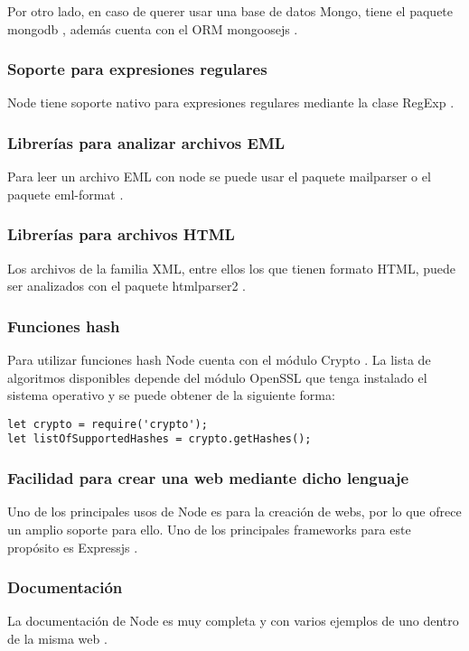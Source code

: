 Por otro lado, en caso de querer usar una base de datos Mongo, tiene el paquete mongodb \cite{node_mongo_driver}, además cuenta con el ORM mongoosejs \cite{node_Mongoosejs}.

\subsubsection{Soporte para expresiones regulares}
Node tiene soporte nativo para expresiones regulares mediante la clase RegExp \cite{node_regex}.

\subsubsection{Librerías para analizar archivos EML}
Para leer un archivo EML con node se puede usar el paquete mailparser \cite{node_mailparser} o el paquete eml-format \cite{node_eml_format}.

\subsubsection{Librerías para archivos HTML}
Los archivos de la familia XML, entre ellos los  que tienen formato HTML, puede ser analizados con el paquete htmlparser2 \cite{node_htmlparser2}.

\subsubsection{Funciones hash}
Para utilizar funciones hash Node cuenta con el módulo Crypto \cite{node_Crypto}. La lista de algoritmos disponibles depende del módulo OpenSSL que tenga instalado el sistema operativo \cite{node_Crypto_algorithm_options} y se puede obtener de la siguiente forma: 
\begin{verbatim}
let crypto = require('crypto');
let listOfSupportedHashes = crypto.getHashes(); 
\end{verbatim}

\subsubsection{Facilidad para crear una web mediante dicho lenguaje}
Uno de los principales usos de Node es para la creación de webs, por lo que ofrece un amplio soporte para ello. Uno de los principales frameworks para este propósito es Expressjs \cite{node_expressjs}.

\subsubsection{Documentación}
La documentación de Node es muy completa y con varios ejemplos de uno dentro de la misma web \cite{node_docu}. 

